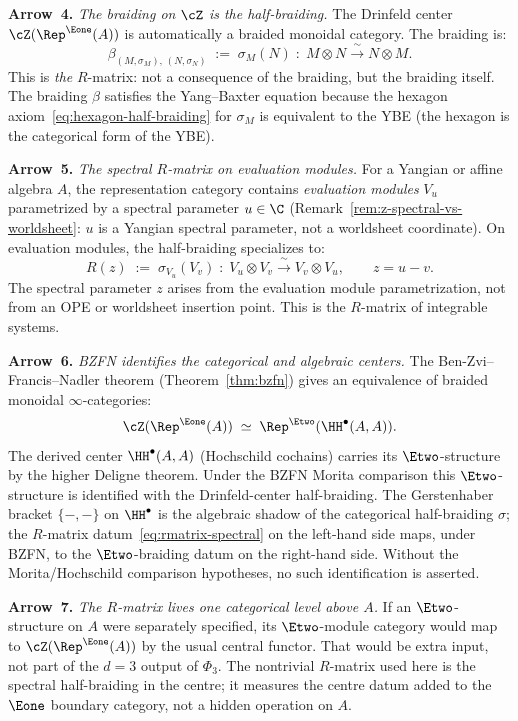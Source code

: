 \begin{construction}
\medskip
\noindent\textbf{Arrow~4.}
\textit{The braiding on $\cZ$ is the half-braiding.}
The Drinfeld center $\cZ(\Rep^{\Eone}(A))$ is automatically
a braided monoidal category. The braiding is:
\begin{equation}
\label{eq:braiding-is-half-braiding}
 \beta_{(M,\sigma_M),\,(N,\sigma_N)}
 \;:=\; \sigma_M(N)
 \;\colon\; M \otimes N \xrightarrow{\;\sim\;} N \otimes M.
\end{equation}
This is \emph{the} $R$-matrix: not a consequence of the
braiding, but the braiding itself. The braiding
$\beta$ satisfies the Yang--Baxter equation because
the hexagon axiom~\eqref{eq:hexagon-half-braiding} for
$\sigma_M$ is equivalent to the YBE (the hexagon is the
categorical form of the YBE).

\medskip
\noindent\textbf{Arrow~5.}
\textit{The spectral $R$-matrix on evaluation modules.}
For a Yangian or affine algebra $A$, the representation
category contains \emph{evaluation modules} $V_u$
parametrized by a spectral parameter $u \in \C$
(Remark~\ref{rem:z-spectral-vs-worldsheet}: $u$ is a
Yangian spectral parameter, not a worldsheet coordinate).
On evaluation modules, the half-braiding specializes to:
\begin{equation}
\label{eq:rmatrix-spectral}
 R(z) \;:=\; \sigma_{V_u}(V_v)
 \;\colon\; V_u \otimes V_v \xrightarrow{\;\sim\;} V_v \otimes V_u,
 \qquad z = u - v.
\end{equation}
The spectral parameter $z$ arises from the evaluation
module parametrization, not from an OPE or worldsheet
insertion point. This is the $R$-matrix of integrable
systems.

\medskip
\noindent\textbf{Arrow~6.}
\textit{BZFN identifies the categorical and algebraic centers.}
The Ben-Zvi--Francis--Nadler theorem
(Theorem~\ref{thm:bzfn}) gives an equivalence of braided
monoidal $\infty$-categories:
\[
 \cZ(\Rep^{\Eone}(A))
 \;\simeq\;
 \Rep^{\Etwo}(\HH^\bullet(A, A)).
\]
The derived center $\HH^\bullet(A, A)$ (Hochschild cochains)
carries its $\Etwo$-structure by the higher Deligne theorem. Under
the BZFN Morita comparison this $\Etwo$-structure is identified with
the Drinfeld-center half-braiding. The Gerstenhaber bracket
$\{-,-\}$ on $\HH^\bullet$ is the algebraic shadow of the categorical
half-braiding $\sigma$; the $R$-matrix datum~\eqref{eq:rmatrix-spectral}
on the left-hand side maps, under BZFN, to the $\Etwo$-braiding datum
on the right-hand side. Without the Morita/Hochschild comparison
hypotheses, no such identification is asserted.

\medskip
\noindent\textbf{Arrow~7.}
\textit{The $R$-matrix lives one categorical level above $A$.}
If an $\Etwo$-structure on $A$ were separately specified, its
$\Etwo$-module category would map to
$\cZ(\Rep^{\Eone}(A))$ by the usual central functor. That would be
extra input, not part of the $d = 3$ output of $\Phi_3$. The
nontrivial $R$-matrix used here is the spectral half-braiding in the
centre; it measures the centre datum added to the $\Eone$ boundary
category, not a hidden operation on $A$.
\end{construction}

